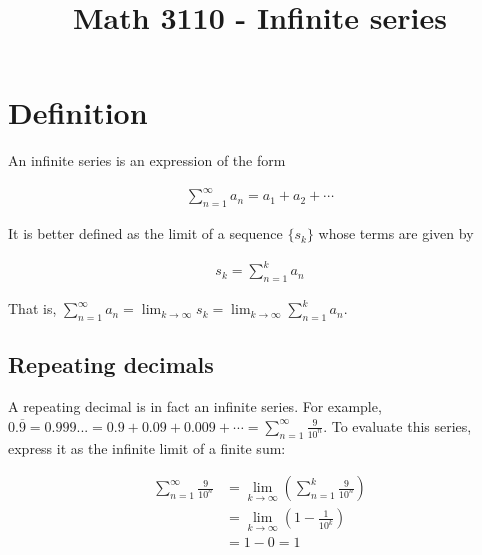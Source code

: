 

\title{Math 3110 - Infinite series}
\author{\name}
\maketitle

\section{Definition}
An infinite series is an expression of the form

\begin{align*}
  \sum_{n = 1}^{\infty} a_n = a_1 + a_2 + \cdots
\end{align*}

It is better defined as the limit of a sequence $\{s_k\}$ whose terms are given by

\begin{align*}
  s_k = \sum_{n = 1}^k a_n
\end{align*}

That is, $\sum_{n = 1}^{\infty} a_n = \lim_{k \rightarrow \infty} s_k = \lim_{k \rightarrow \infty} \sum_{n = 1}^{k} a_n$.

\subsection{Repeating decimals}

A repeating decimal is in fact an infinite series. For example, $0.\overline{9} = 0.999... = 0.9 + 0.09 + 0.009 + \cdots = \sum_{n = 1}^{\infty} \frac{9}{10^n}$. To evaluate this series, express it as the infinite limit of a finite sum:

\begin{align*}
  \sum_{n = 1}^{\infty} \frac{9}{10^n} &= \lim_{k \rightarrow \infty} \left(\sum_{n = 1}^{k} \frac{9}{10^n}\right) \\
  &= \lim_{k \rightarrow \infty} \left(1 - \frac{1}{10^k}\right) \\
  &= 1 - 0 = 1
\end{align*}


